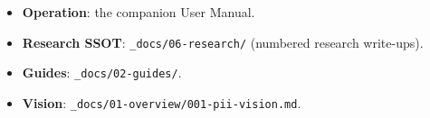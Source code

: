 \documentclass[
	fontsize=10pt,
	twoside=false,
	secnumdepth=2,
	open=any,
]{kaobook}
\begin{document}
\begin{itemize}
    \item \textbf{Operation}: the companion User Manual.
    \item \textbf{Research SSOT}: \texttt{\_docs/06-research/} (numbered
        research write-ups).
    \item \textbf{Guides}: \texttt{\_docs/02-guides/}.
    \item \textbf{Vision}: \texttt{\_docs/01-overview/001-pii-vision.md}.
\end{itemize}

\backmatter
{}

\printindex
\end{document}
